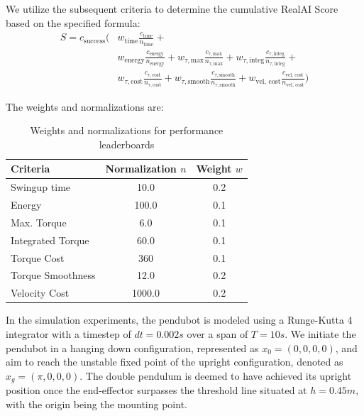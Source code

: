 We utilize the subsequent criteria to determine the cumulative RealAI Score based on the specified formula:
\begin{equation}
\begin{aligned}
S = c_{\text{success}} \Bigg(& w_{\text{time}}\frac{c_{\text{time}}}{n_{\text{time}}} + \\
& w_{\text{energy}}\frac{c_{\text{energy}}}{n_{\text{energy}}} +
w_{\tau, \text{max}}\frac{c_{\tau, \text{max}}}{n_{\tau, \text{max}}} +
w_{\tau, \text{integ}}\frac{c_{\tau, \text{integ}}}{n_{\tau, \text{integ}}} + \\
& w_{\tau, \text{cost}}\frac{c_{\tau, \text{cost}}}{n_{\tau, \text{cost}}} +
w_{\tau, \text{smooth}}\frac{c_{\tau, \text{smooth}}}{n_{\tau, \text{smooth}}} +
w_{\text{vel, cost}}\frac{c_{\text{vel, cost}}}{n_{\text{vel, cost}}} \Bigg)
\end{aligned}
\end{equation}

The weights and normalizations are:
\begin{table}[H]
  \centering
  \begin{tabular}{lcc}
    \hline
    Criteria & Normalization \(\mathit{n}\) & Weight \(\mathit{w}\) \\
    \hline
    Swingup time & 10.0 & 0.2 \\
    Energy & 100.0 & 0.1 \\
    Max. Torque & 6.0 & 0.1 \\
    Integrated Torque & 60.0 & 0.1 \\
    Torque Cost & 360 & 0.1 \\
    Torque Smoothness & 12.0 & 0.2 \\
    Velocity Cost & 1000.0 & 0.2 \\
    \hline
  \end{tabular}
  \caption{Weights and normalizations for performance leaderboards}
  \label{tab:performance}
\end{table}

In the simulation experiments, the pendubot is modeled using a Runge-Kutta 4 integrator with a timestep of \(dt=0.002s\) over a span of \(T=10s\). We initiate the pendubot in a hanging down configuration, represented as \(x_0 = (0, 0, 0, 0)\), and aim to reach the unstable fixed point of the upright configuration, denoted as \(x_g = (\pi, 0, 0, 0)\). The double pendulum is deemed to have achieved its upright position once the end-effector surpasses the threshold line situated at \(h=0.45m\), with the origin being the mounting point.

